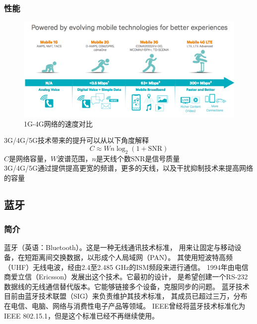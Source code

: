 \documentclass[11pt]{article}
\begin{document}
\subsubsection{性能}
\begin{figure}[H]
    \begin{center}
    \includegraphics[width=\textwidth]{figures//cellular_speed.png}
    \caption{1G-4G网络的速度对比}
    \end{center}
\end{figure}
3G/4G/5G技术带来的提升可以从以下角度解释
\begin{displaymath}
    C \approx W n \log_{2} (1 + \mathrm{SNR})
\end{displaymath}
$C$是网络容量，$W$波谱范围，$n$是天线个数$\mathrm{SNR}$是信号质量\\
3G/4G/5G通过提供提高更宽的频谱，更多的天线，以及干扰抑制技术来提高网络的容量
\subsection{蓝牙}
\subsubsection{简介}
蓝牙（英语：Bluetooth）。这是一种无线通讯技术标准，
用来让固定与移动设备，在短距离间交换数据，以形成个人局域网（PAN）。
其使用短波特高频（UHF）无线电波，经由2.4至2.485 GHz的ISM频段来进行通信。
1994年由电信商爱立信（Ericsson）发展出这个技术。它最初的设计，
是希望创建一个RS-232数据线的无线通信替代版本。它能够链接多个设备，克服同步的问题。
蓝牙技术目前由蓝牙技术联盟（SIG）来负责维护其技术标准，
其成员已超过三万，分布在电信、电脑、网络与消费性电子产品等领域。
IEEE曾经将蓝牙技术标准化为IEEE 802.15.1，但是这个标准已经不再继续使用。
\end{document}
